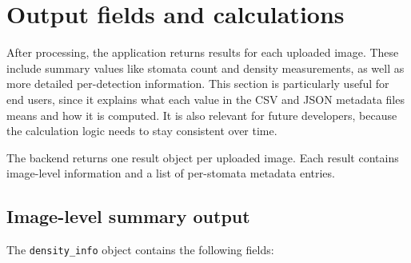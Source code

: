 \documentclass{article}
\begin{document}
\section{Output fields and calculations}\label{section:output_fields_and_calculations}

After processing, the application returns results for each uploaded image. These include summary values like stomata count and density measurements, as well as more detailed per-detection information. This section is particularly useful for end users, since it explains what each value in the CSV and JSON metadata files means and how it is computed. It is also relevant for future developers, because the calculation logic needs to stay consistent over time.

The backend returns one result object per uploaded image. Each result contains image-level information and a list of per-stomata metadata entries.

\subsection{Image-level summary output}

The \texttt{density\_info} object contains the following fields:
\end{document}
